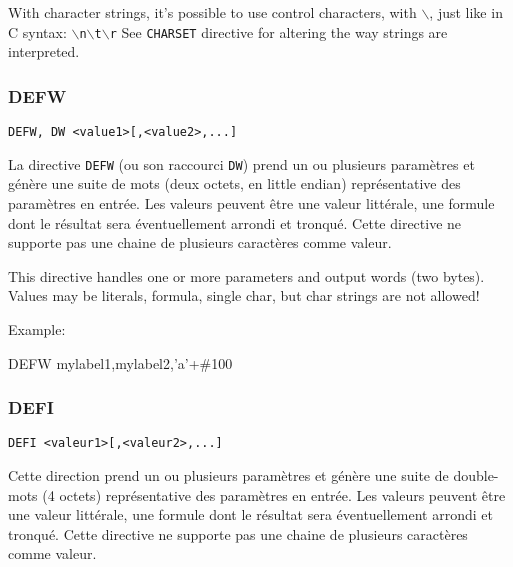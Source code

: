 \begin{xen}
With character strings, it's possible to use control characters, with $\backslash$,  just like in C syntax: \texttt{$\backslash$n$\backslash$t$\backslash$r}
See \texttt{CHARSET} directive for altering the way strings are interpreted.
\end{xen}



\subsubsection{DEFW}

\begin{verbatim}
DEFW, DW <value1>[,<value2>,...]
\end{verbatim}

\begin{xfr}
La directive \texttt{DEFW} (ou son raccourci \texttt{DW}) prend un ou plusieurs paramètres et génère une suite de mots (deux octets, en little endian) représentative des paramètres en entrée.
Les valeurs peuvent être une valeur littérale, une formule dont le résultat sera éventuellement arrondi et tronqué.
Cette directive ne supporte pas une chaine de plusieurs caractères comme valeur.
\end{xfr}

\begin{xen}
This directive handles one or more parameters and output words (two bytes). Values may be literals, formula, single char, but char strings are not allowed!
\end{xen}

Example:
\begin{code}
DEFW mylabel1,mylabel2,'a'+\#100
\end{code}

\subsubsection{DEFI}
\begin{xfr}
\begin{verbatim}
DEFI <valeur1>[,<valeur2>,...]
\end{verbatim}

Cette direction prend un ou plusieurs paramètres et génère une suite de double-mots (4 octets) représentative des paramètres en entrée. Les valeurs peuvent être une valeur littérale, une formule dont le résultat sera éventuellement arrondi et tronqué. Cette directive ne supporte pas une chaine de plusieurs caractères comme valeur.
\end{xfr}

